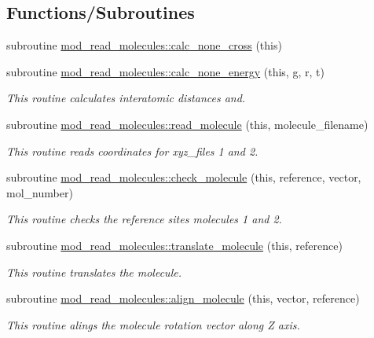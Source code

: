 \subsection*{Functions/\+Subroutines}
\begin{DoxyCompactItemize}
\item 
subroutine \hyperlink{namespacemod__read__molecules_a5e6a958bafd00dfe5c9279092970ae47}{mod\+\_\+read\+\_\+molecules\+::calc\+\_\+none\+\_\+cross} (this)
\item 
subroutine \hyperlink{namespacemod__read__molecules_a137ae89987a14c217f0bcfba8ca493ec}{mod\+\_\+read\+\_\+molecules\+::calc\+\_\+none\+\_\+energy} (this, g, r, t)
\begin{DoxyCompactList}\small\item\em This routine calculates interatomic distances and. \end{DoxyCompactList}\item 
subroutine \hyperlink{namespacemod__read__molecules_a61dd5623986abe13f76dfed8a5ad1e35}{mod\+\_\+read\+\_\+molecules\+::read\+\_\+molecule} (this, molecule\+\_\+filename)
\begin{DoxyCompactList}\small\item\em This routine reads coordinates for xyz\+\_\+files 1 and 2. \end{DoxyCompactList}\item 
subroutine \hyperlink{namespacemod__read__molecules_aae2115ec246e295817cd546bda666e23}{mod\+\_\+read\+\_\+molecules\+::check\+\_\+molecule} (this, reference, vector, mol\+\_\+number)
\begin{DoxyCompactList}\small\item\em This routine checks the reference sites molecules 1 and 2. \end{DoxyCompactList}\item 
subroutine \hyperlink{namespacemod__read__molecules_a516f16861094339983ebcd9af3fedbaa}{mod\+\_\+read\+\_\+molecules\+::translate\+\_\+molecule} (this, reference)
\begin{DoxyCompactList}\small\item\em This routine translates the molecule. \end{DoxyCompactList}\item 
subroutine \hyperlink{namespacemod__read__molecules_ae228ade0f7ea15cdb9d186848ae4eae7}{mod\+\_\+read\+\_\+molecules\+::align\+\_\+molecule} (this, vector, reference)
\begin{DoxyCompactList}\small\item\em This routine alings the molecule rotation vector along Z axis. \end{DoxyCompactList}\item 

\end{DoxyCompactItemize}
